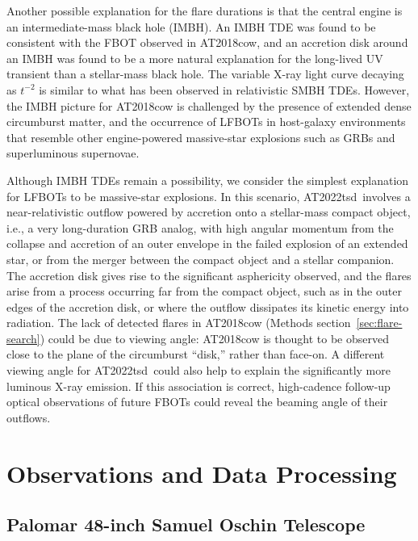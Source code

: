 \documentclass{nature_plusfigure}
\newcommand{\at}{AT2022tsd}
\begin{document}
\begin{methods}
Another possible explanation for the flare durations is that the central engine is an intermediate-mass black hole (IMBH). An IMBH TDE was found to be consistent with the FBOT observed in AT2018cow\cite{Kuin2019,Perley2019}, and an accretion disk around an IMBH was found to be a more natural explanation for the long-lived UV transient than a stellar-mass black hole\cite{Chen2023}. The variable X-ray light curve decaying as $t^{-2}$ is similar to what has been observed in relativistic SMBH TDEs. However, the IMBH picture for AT2018cow is challenged\cite{Metzger2022} by the presence of extended dense circumburst matter\cite{Ho2019,Nayana2021}, and the occurrence of LFBOTs in host-galaxy environments that resemble other engine-powered massive-star explosions such as GRBs and superluminous supernovae\cite{Lyman2020}. 

Although IMBH TDEs remain a possibility, we consider the simplest explanation for LFBOTs to be massive-star explosions. In this scenario, \at\ involves a near-relativistic outflow powered by accretion onto a stellar-mass compact object, i.e., a very long-duration GRB analog\cite{Quataert2012}, with high angular momentum from the collapse and accretion of an outer envelope in the failed explosion of an extended star\cite{Perley2021,Metzger2022}, or from the merger between the compact object and a stellar companion\cite{Metzger2022}. The accretion disk gives rise to the significant asphericity observed\cite{Maund2023}, and the flares arise from a process occurring far from the compact object, such as in the outer edges of the accretion disk, or where the outflow dissipates its kinetic energy into radiation. The lack of detected flares in AT2018cow (Methods section~\ref{sec:flare-search}) could be due to viewing angle: AT2018cow is thought to be observed close to the plane of the circumburst ``disk,'' rather than face-on\cite{Margutti2019,Chen2023}. A different viewing angle for \at\ could also help to explain the significantly more luminous X-ray emission.
If this association is correct, high-cadence follow-up optical observations of future FBOTs could reveal the beaming angle of their outflows.

\section{Observations and Data Processing}

\subsection{Palomar 48-inch Samuel Oschin Telescope}
\label{sec:p48}


\end{methods}
\end{document}
